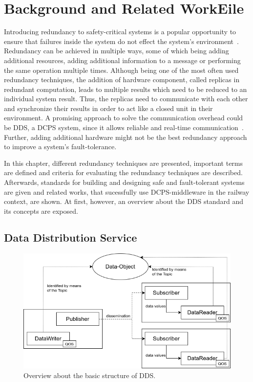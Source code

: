 \chapter{Background and Related WorkEile}
\label{chptr:concepts}

Introducing redundancy to safety-critical systems is a popular opportunity to ensure that failures inside the system do not effect the system's environment~\cite{BarryFaultToleranceAnalysis}.
Redundancy can be achieved in multiple ways, some of which being adding additional resources, adding additional information to a message or performing the same operation multiple times.
Although being one of the most often used redundancy techniques, the addition of hardware component, called replicas in redundant computation, leads to multiple results which need to be reduced to an individual system result.
Thus, the replicas need to communicate with each other and synchronize their results in order to act like a closed unit in their environment.
A promising approach to solve the communication overhead could be \gls*{DDS}, a \gls*{DCPS} system, since it allows reliable and real-time communication~\cite{omgDDSspec}.
Further, adding additional hardware might not be the best redundancy approach to improve a system's fault-tolerance.

In this chapter, different redundancy techniques are presented, important terms are defined and criteria for evaluating the redundancy techniques are described.
Afterwards, standards for building and designing safe and fault-tolerant systems are given and related works, that sucessfully use \gls*{DCPS}-middleware in the railway context, are shown.
At first, however, an overview about the \gls*{DDS} standard and its concepts are exposed.


\section{Data Distribution Service}

\begin{figure}[!hb]
	\centering
	\includegraphics[width=0.75\linewidth]{images/DDSStructure}
	\caption{Overview about the basic structure of \gls*{DDS}.}
	\label{fig:DDSStructure}
\end{figure}

